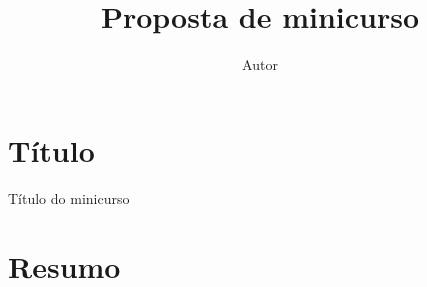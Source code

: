 \documentclass[12pt]{article}
\title{Proposta de minicurso}
\author{Autor}
\date{}
\begin{document}
\maketitle

\section{Título}

Título do minicurso

\section{Resumo}

\lipsum[1-2]
\end{document}

